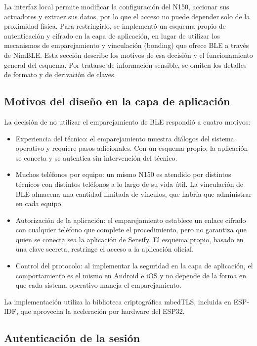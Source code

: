 La interfaz local permite modificar la configuración del N150, accionar sus actuadores y extraer sus datos, por lo que el acceso no puede depender solo de la proximidad física. Para restringirlo, se implementó un esquema propio de autenticación y cifrado en la capa de aplicación, en lugar de utilizar los mecanismos de emparejamiento y vinculación (bonding) que ofrece BLE a través de NimBLE. Esta sección describe los motivos de esa decisión y el funcionamiento general del esquema. Por tratarse de información sensible, se omiten los detalles de formato y de derivación de claves.

\subsection{Motivos del diseño en la capa de aplicación}
\label{subsec:auth_motivos}

La decisión de no utilizar el emparejamiento de BLE respondió a cuatro motivos:

\begin{itemize}
\item Experiencia del técnico: el emparejamiento muestra diálogos del sistema operativo y requiere pasos adicionales. Con un esquema propio, la aplicación se conecta y se autentica sin intervención del técnico.
\item Muchos teléfonos por equipo: un mismo N150 es atendido por distintos técnicos con distintos teléfonos a lo largo de su vida útil. La vinculación de BLE almacena una cantidad limitada de vínculos, que habría que administrar en cada equipo.
\item Autorización de la aplicación: el emparejamiento establece un enlace cifrado con cualquier teléfono que complete el procedimiento, pero no garantiza que quien se conecta sea la aplicación de Sensify. El esquema propio, basado en una clave secreta, restringe el acceso a la aplicación oficial.
\item Control del protocolo: al implementar la seguridad en la capa de aplicación, el comportamiento es el mismo en Android e iOS y no depende de la forma en que cada sistema operativo maneja el emparejamiento.
\end{itemize}

La implementación utiliza la biblioteca criptográfica mbedTLS, incluida en ESP-IDF, que aprovecha la aceleración por hardware del ESP32.

\subsection{Autenticación de la sesión}
\label{subsec:auth_sesion}

